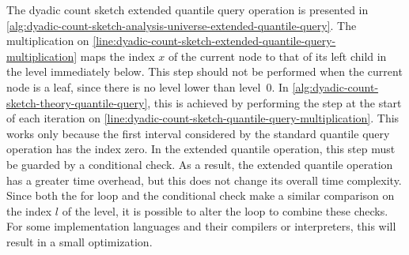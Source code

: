 The dyadic count sketch extended quantile query operation is presented in \cref{alg:dyadic-count-sketch-analysis-universe-extended-quantile-query}.
The multiplication on \cref{line:dyadic-count-sketch-extended-quantile-query-multiplication} maps the index \( x \) of the current node to that of its left child in the level immediately below.
This step should not be performed when the current node is a leaf, since there is no level lower than level~\( 0 \).
In \cref{alg:dyadic-count-sketch-theory-quantile-query}, this is achieved by performing the step at the start of each iteration on \cref{line:dyadic-count-sketch-quantile-query-multiplication}.
This works only because the first interval considered by the standard quantile query operation has the index zero.
In the extended quantile operation, this step must be guarded by a conditional check.
As a result, the extended quantile operation has a greater time overhead, but this does not change its overall time complexity.
Since both the for loop and the conditional check make a similar comparison on the index \( l \) of the level, it is possible to alter the loop to combine these checks.
For some implementation languages and their compilers or interpreters, this will result in a small optimization.
